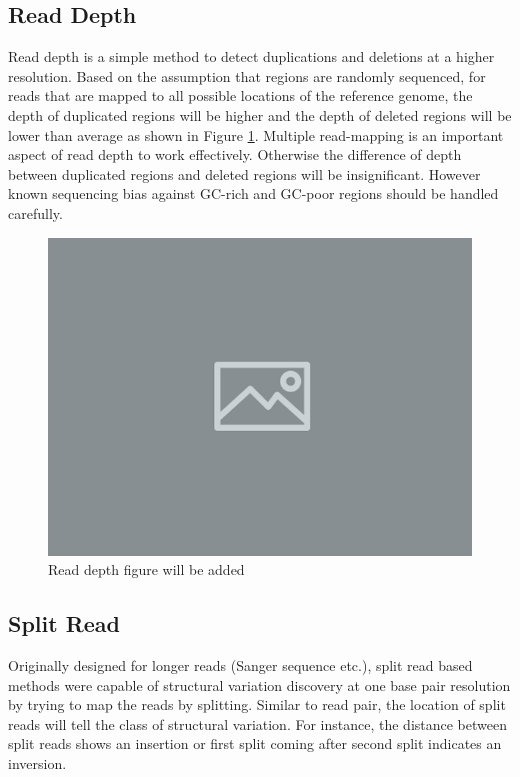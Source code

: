 \subsection{Read Depth}
Read depth is a simple method to detect duplications and deletions at a higher resolution. Based on the assumption that regions are randomly sequenced, for reads that are mapped to all possible locations of the reference genome, the depth of duplicated regions will be higher and the depth of deleted regions will be lower than average \cite{bailey2002recent} as shown in Figure \ref{readdepth}. Multiple read-mapping is an important aspect of read depth to work effectively. Otherwise the difference of depth between duplicated regions and deleted regions will be insignificant. However known sequencing bias against GC-rich and GC-poor regions \cite{smith2008rapid} should be handled carefully.

\begin{figure}[ht]
    \centering
    \includegraphics[scale=0.4]{images/placeholder.jpg}
    \caption{Read depth figure will be added}
    \label{readdepth}
\end{figure}

\subsection{Split Read}
Originally designed for longer reads (Sanger sequence etc.), split read based methods were capable of structural variation discovery at one base pair resolution by trying to map the reads by splitting. Similar to read pair, the location of split reads will tell the class of structural variation. For instance, the distance between split reads shows an insertion or first split coming after second split indicates an inversion.


